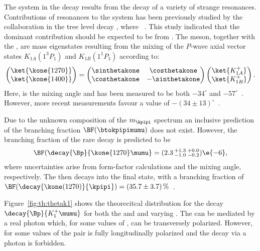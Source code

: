 The \kpipi system in the decay \btokpipimumu results from the decay of a variety of strange
resonances.
Contributions of resonances to the \kpipi system has been previously studied by the \belle
collaboration in the tree level decay \btojpsikpipi, where \jpsitomumu~\cite{Guler:2010if}.
This study indicated that the dominant contribution should be expected
to be from .
The  meson, together with the , are mass eigenstates resulting from the
mixing of the $P$-wave axial vector states $K_{1A}(1^3P_1)$ and $K_{1B}(1^1P_1)$ according to:
\begin{equation}
  \begin{pmatrix}
    \ket{\kone{1270}} \\
    \ket{\kone{1400}}
  \end{pmatrix}
  =
  \begin{pmatrix}
    \sinthetakone & \costhetakone \\
    \costhetakone & -\sinthetakone
  \end{pmatrix}
  \begin{pmatrix}
    \ket{K_{1A}^+} \\
    \ket{K_{1B}^+}
  \end{pmatrix}.
  \label{eq:k1mixing}
\end{equation}
Here, \thetakone is the mixing angle and has been measured to be both $-34^\circ$ and
$-57^\circ$~\cite{PhysRevD.47.1252,Tayduganov:2011ui,Hatanaka:2008xj,Cheng:2011pb,Divotgey:2013jba,Cheng:2013cwa}.
However, more recent measurements favour a value of
$-(34\pm13)^\circ$~\cite{Hatanaka:2008xj,Cheng:2011pb,Divotgey:2013jba,Cheng:2013cwa}.

Due to the unknown composition of the $m_\kpipi$ spectrum an inclusive prediction of the branching
fraction $\BF(\btokpipimumu)$ does not exist.
However, the branching fraction of the rare decay  is predicted to
be~\cite{Hatanaka:2008gu}
\begin{equation}
  \BF(\decay{\Bp}{\kone{1270}\mumu} = (2.3\,^{+1.3}_{-1.0}\,^{+0.0}_{-0.2})\e{-6},
\end{equation}
where uncertainties arise from form-factor calculations and the mixing angle, respectively.
The  then decays into the \kpipi final state, with a branching fraction of
$\BF(\decay{\kone(1270)}{\kpipi})=(35.7\pm3.7)\,\%$~\cite{PDG2012}.

Figure~\ref{fig:th:thetak1} shows the theorecitcal \qsq distribution for the decay
$\decay{\Bp}{K_1^+\mumu}$ for both the  and  and varying \thetakone.
The  can be mediated by a real photon which, for some values of \thetakone, can be
transversely polarized.
However, for some values of \thetakone the \mumu pair is fully longitudinally polarized and the
decay via a photon is forbidden.

